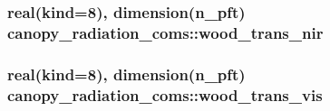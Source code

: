 \subsubsection[{wood\+\_\+trans\+\_\+nir}]{\setlength{\rightskip}{0pt plus 5cm}real(kind=8), dimension(n\+\_\+pft) canopy\+\_\+radiation\+\_\+coms\+::wood\+\_\+trans\+\_\+nir}\label{namespacecanopy__radiation__coms_ac71bbd6b94c73251f3181441d9930d48}
\hypertarget{namespacecanopy__radiation__coms_add3e4a271e770993c7867304bd138bf2}{}
\subsubsection[{wood\+\_\+trans\+\_\+vis}]{\setlength{\rightskip}{0pt plus 5cm}real(kind=8), dimension(n\+\_\+pft) canopy\+\_\+radiation\+\_\+coms\+::wood\+\_\+trans\+\_\+vis}\label{namespacecanopy__radiation__coms_add3e4a271e770993c7867304bd138bf2}
